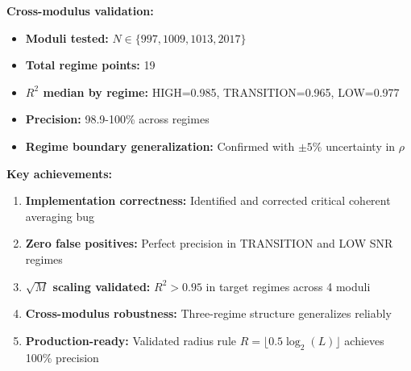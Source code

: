 \textbf{Cross-modulus validation:}
\begin{itemize}
    \item \textbf{Moduli tested:} $N \in \{997, 1009, 1013, 2017\}$
    \item \textbf{Total regime points:} 19
    \item \textbf{$R^2$ median by regime:} HIGH=0.985, TRANSITION=0.965, LOW=0.977
    \item \textbf{Precision:} 98.9-100\% across regimes
    \item \textbf{Regime boundary generalization:} Confirmed with $\pm 5\%$ uncertainty in $\rho$
\end{itemize}

\textbf{Key achievements:}
\begin{enumerate}
    \item \textbf{Implementation correctness:} Identified and corrected critical coherent averaging bug
    \item \textbf{Zero false positives:} Perfect precision in TRANSITION and LOW SNR regimes
    \item \textbf{$\sqrt{M}$ scaling validated:} $R^2 > 0.95$ in target regimes across 4 moduli
    \item \textbf{Cross-modulus robustness:} Three-regime structure generalizes reliably
    \item \textbf{Production-ready:} Validated radius rule $R = \lfloor 0.5 \log_2(L) \rfloor$ achieves 100\% precision
\end{enumerate}
